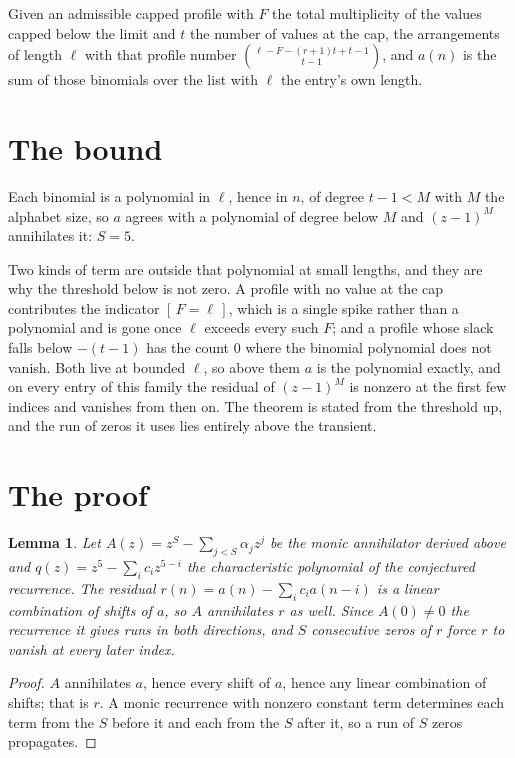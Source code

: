 \documentclass[11pt,a4paper]{article}
\theoremstyle{plain}
\newtheorem{lemma}[theorem]{Lemma}
\theoremstyle{definition}
\begin{document}
Given an admissible capped profile with $F$ the total multiplicity of the values capped below
the limit and $t$ the number of values at the cap, the arrangements of length $\ell$ with that
profile number $\binom{\ell-F-(r+1)t+t-1}{t-1}$, and $a(n)$ is the sum of those binomials
over the list with $\ell$ the entry's own length.

\section{The bound}

Each binomial is a polynomial in $\ell$, hence in $n$, of degree $t-1<M$ with $M$ the alphabet
size, so $a$ agrees with a polynomial of degree below $M$ and $(z-1)^{M}$ annihilates it:
$S=5$.

Two kinds of term are outside that polynomial at small lengths, and they are why the threshold
below is not zero. A profile with no value at the cap contributes the indicator
$[\,F=\ell\,]$, which is a single spike rather than a polynomial and is gone once
$\ell$ exceeds every such $F$; and a profile whose slack falls below $-(t-1)$ has the count
$0$ where the binomial polynomial does not vanish. Both live at bounded $\ell$, so above them
$a$ is the polynomial exactly, and on every entry of this family the residual of $(z-1)^{M}$
is nonzero at the first few indices and vanishes from then on. The theorem is stated from the
threshold up, and the run of zeros it uses lies entirely above the transient.

\section{The proof}

\begin{lemma}\label{lem:crit}
Let $A(z)=z^S-\sum_{j<S}\alpha_jz^{j}$ be the monic annihilator derived above and
$q(z)=z^{5}-\sum_ic_iz^{5-i}$ the characteristic polynomial of the conjectured
recurrence. The residual $r(n)=a(n)-\sum_ic_ia(n-i)$ is a linear combination of shifts of $a$,
so $A$ annihilates $r$ as well. Since $A(0)\ne0$ the recurrence it gives runs in both
directions, and $S$ consecutive zeros of $r$ force $r$ to vanish at every later index.
\end{lemma}

\begin{proof}
$A$ annihilates $a$, hence every shift of $a$, hence any linear combination of shifts; that is
$r$. A monic recurrence with nonzero constant term determines each term from the $S$ before it
and each from the $S$ after it, so a run of $S$ zeros propagates.
\end{proof}
\end{document}

